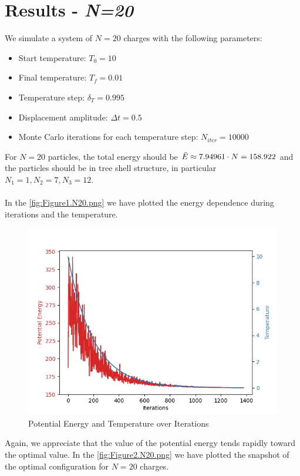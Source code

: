\documentclass{article}
\begin{document}
\section{Results - \textit{N=20}}
We simulate a system of $N=20$ charges with the following parameters:
\begin{itemize}
    \item Start temperature: $T_0=10$
    \item Final temperature: $T_f=0.01$
    \item Temperature step: $\delta_T=0.995$
    \item Displacement amplitude: $\Delta t=0.5$
    \item Monte Carlo iterations for each temperature step: $N_{iter}=10000$
\end{itemize}
For $N=20$ particles, the total energy should be $ \Tilde{E}\approx7.94961\cdot N=158.922
$ and the particles should be in tree shell structure, in particular $N_1=1,N_2=7,N_3=12$.\\\\
In the \autoref{fig:Figure1.N20.png} we have plotted the energy dependence during iterations and the temperature.
\begin{figure}[H]
    \centering
    \includegraphics[width=\linewidth]{images/Figure1.N20.png}
    \caption{Potential Energy and Temperature over Iterations}
    \label{fig:Figure1.N20.png}
\end{figure}
\noindent Again, we appreciate that the value of the potential energy tends rapidly toward the optimal value.
\clearpage
\noindent In the \autoref{fig:Figure2.N20.png} we have plotted the snapshot of the optimal configuration for $N=20$ charges.
\end{document}
